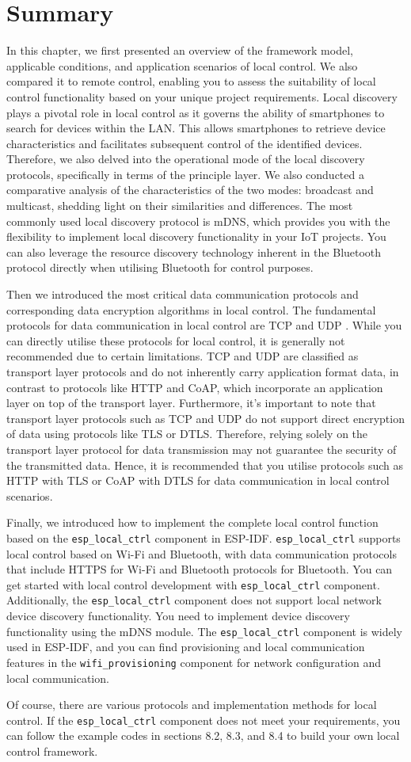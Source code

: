 \documentclass[a4paper,12pt]{book}
\begin{document}
\section{Summary}
In this chapter, we first presented an overview of the framework model, applicable conditions, and application scenarios of local control. We also compared it to remote control, enabling you to assess the suitability of local control functionality based on your unique project requirements. Local discovery plays a pivotal role in local control as it governs the ability of smartphones to search for devices within the LAN. This allows smartphones to retrieve device characteristics and facilitates subsequent control of the identified devices. Therefore, we also delved into the operational mode of the local discovery protocols, specifically in terms of the principle layer. We also conducted a comparative analysis of the characteristics of the two modes: broadcast and multicast, shedding light on their similarities and differences. The most commonly used local discovery protocol is mDNS, which provides you with the flexibility to implement local discovery functionality in your IoT projects. You can also leverage the resource discovery technology inherent in the Bluetooth protocol directly when utilising Bluetooth for control purposes.

Then we introduced the most critical data communication protocols and corresponding data encryption algorithms in local control. The fundamental protocols for data communication in local control are TCP and UDP . While you can directly utilise these protocols for local control, it is generally not recommended due to certain limitations. TCP and UDP are classified as transport layer protocols and do not inherently carry application format data, in contrast to protocols like HTTP and CoAP, which incorporate an application layer on top of the transport layer. Furthermore, it’s important to note that transport layer protocols such as TCP and UDP do not support direct encryption of data using protocols like TLS or DTLS. Therefore, relying solely on the transport layer protocol for data transmission may not guarantee the security of the transmitted data. Hence, it is recommended that you utilise protocols such as HTTP with TLS or CoAP with DTLS for data communication in local control scenarios. 

Finally, we introduced how to implement the complete local control function based on the \verb|esp_local_ctrl| component in ESP-IDF. \verb|esp_local_ctrl| supports local control based on Wi-Fi and Bluetooth, with data communication protocols that include HTTPS for Wi-Fi and Bluetooth protocols for Bluetooth. You can get started with local control development with \verb|esp_local_ctrl| component. Additionally, the \verb|esp_local_ctrl| component does not support local network device discovery functionality. You need to implement device discovery functionality using the mDNS module. The \verb|esp_local_ctrl| component is widely used in ESP-IDF, and you can find provisioning and local communication features in the \verb|wifi_provisioning| component for network configuration and local communication.

Of course, there are various protocols and implementation methods for local control. If the \verb|esp_local_ctrl| component does not meet your requirements, you can follow the example codes in sections 8.2, 8.3, and 8.4 to build your own local control framework.
\end{document}
